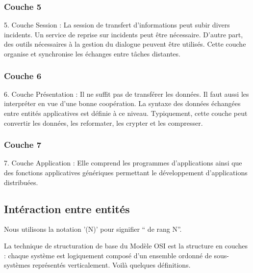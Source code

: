 \subsubsection{Couche 5}
5. Couche Session : La session de transfert d'informations peut subir divers incidents. Un service de reprise sur incidents peut être nécessaire. D'autre part, des outils nécessaires à la gestion du dialogue peuvent être utilisés. Cette couche organise et synchronise les échanges entre tâches distantes.
\subsubsection{Couche 6}
6. Couche Présentation : Il ne suffit pas de transférer les données. Il faut aussi les interpréter en vue d'une bonne coopération. La syntaxe des données échangées entre entités applicatives est définie à ce niveau. Typiquement, cette couche peut convertir les données, les reformater, les crypter et les compresser.
\subsubsection{Couche 7}
7. Couche Application : Elle comprend les programmes d'applications ainsi que des fonctions applicatives génériques permettant le développement d'applications distribuées.

\subsection{Intéraction entre entités}
Nous utilisons la notation '(N)' pour signifier `` de rang N''.

La technique de structuration de base du Modèle OSI est la structure en couches : chaque système est logiquement composé d'un ensemble ordonné de sous-systèmes représentés verticalement. Voilà quelques définitions.
